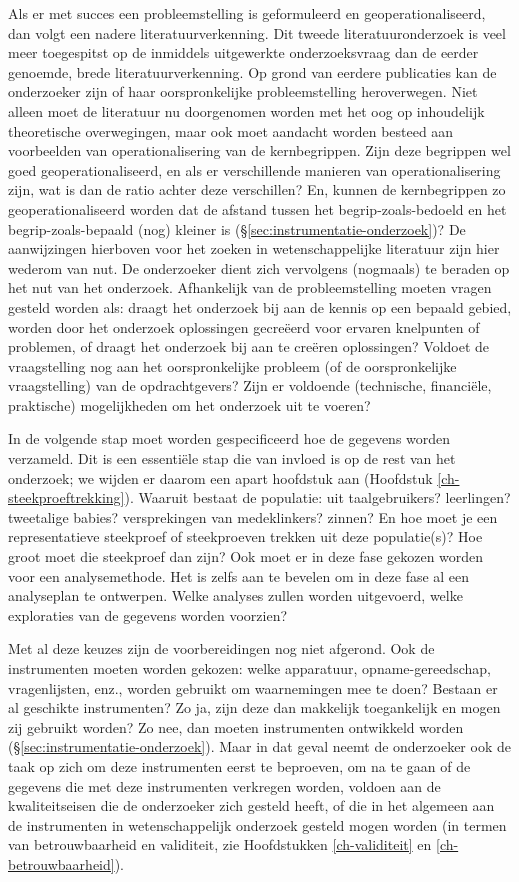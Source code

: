 \documentclass[
]{book}
\begin{document}
Als er met succes een probleemstelling is geformuleerd en
geoperationaliseerd, dan volgt een nadere literatuurverkenning. Dit
tweede literatuuronderzoek is veel meer toegespitst op de inmiddels
uitgewerkte onderzoeksvraag dan de eerder genoemde, brede
literatuurverkenning. Op grond van eerdere publicaties kan de
onderzoeker zijn of haar oorspronkelijke probleemstelling heroverwegen.
Niet alleen moet de literatuur nu doorgenomen worden met het oog op
inhoudelijk theoretische overwegingen, maar ook moet aandacht worden
besteed aan voorbeelden van operationalisering van de kernbegrippen.
Zijn deze begrippen wel goed geoperationaliseerd, en als er
verschillende manieren van operationalisering zijn, wat is dan de ratio
achter deze verschillen? En, kunnen de kernbegrippen zo
geoperationaliseerd worden dat de afstand tussen het
begrip-zoals-bedoeld en het begrip-zoals-bepaald (nog) kleiner is
(§\ref{sec:instrumentatie-onderzoek})? De aanwijzingen hierboven
voor het zoeken in wetenschappelijke literatuur zijn hier wederom van
nut. De onderzoeker dient zich vervolgens (nogmaals) te beraden op het
nut van het onderzoek. Afhankelijk van de probleemstelling moeten vragen
gesteld worden als: draagt het onderzoek bij aan de kennis op een
bepaald gebied, worden door het onderzoek oplossingen gecreëerd voor
ervaren knelpunten of problemen, of draagt het onderzoek bij aan te
creëren oplossingen? Voldoet de vraagstelling nog aan het
oorspronkelijke probleem (of de oorspronkelijke vraagstelling) van de
opdrachtgevers? Zijn er voldoende (technische, financiële, praktische)
mogelijkheden om het onderzoek uit te voeren?

In de volgende stap moet worden gespecificeerd hoe de gegevens worden
verzameld. Dit is een essentiële stap die van invloed is op de rest van
het onderzoek; we wijden er daarom een apart hoofdstuk aan
(Hoofdstuk \ref{ch-steekproeftrekking}).
Waaruit bestaat de populatie: uit
taalgebruikers? leerlingen? tweetalige babies? versprekingen van
medeklinkers? zinnen? En hoe moet je een representatieve steekproef of
steekproeven trekken uit deze populatie(s)? Hoe groot moet die
steekproef dan zijn? Ook moet er in deze fase gekozen worden voor een
analysemethode. Het is zelfs aan te bevelen om in deze fase al een
analyseplan te ontwerpen. Welke analyses zullen worden uitgevoerd, welke exploraties van de gegevens worden voorzien?

Met al deze keuzes zijn de voorbereidingen nog niet afgerond. Ook de
instrumenten moeten worden gekozen: welke apparatuur,
opname-gereedschap, vragenlijsten, enz., worden gebruikt om waarnemingen
mee te doen? Bestaan er al geschikte instrumenten? Zo ja, zijn deze dan
makkelijk toegankelijk en mogen zij gebruikt worden? Zo nee, dan moeten
instrumenten ontwikkeld worden
(§\ref{sec:instrumentatie-onderzoek}).
Maar in dat geval neemt de
onderzoeker ook de taak op zich om deze instrumenten eerst te beproeven,
om na te gaan of de gegevens die met deze instrumenten verkregen worden,
voldoen aan de kwaliteitseisen die de onderzoeker zich gesteld heeft, of
die in het algemeen aan de instrumenten in wetenschappelijk onderzoek
gesteld mogen worden (in termen van betrouwbaarheid en validiteit, zie
Hoofdstukken \ref{ch-validiteit} en \ref{ch-betrouwbaarheid}).
\end{document}

